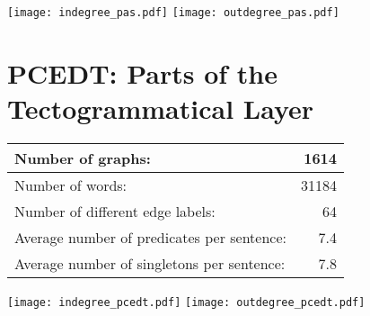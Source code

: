 \documentclass[11pt,a4paper]{article}
\begin{document}
\begin{center}
\texttt{[image: indegree\_pas.pdf]}
\texttt{[image: outdegree\_pas.pdf]}
\end{center}

\section{PCEDT: Parts of the Tectogrammatical Layer}

\begin{tabular}{lr}
\hline\hline
Number of graphs: & 1614\\ 
\hline
Number of words: &  31184\\ 
\hline
Number of different edge labels: & 64\\ 
\hline 
Average number of predicates per sentence:  & 7.4\\ 
\hline 
Average number of singletons per sentence: & 7.8\\
\hline\hline
\end{tabular}
\vspace{10pt}

\begin{center}
\texttt{[image: indegree\_pcedt.pdf]}
\texttt{[image: outdegree\_pcedt.pdf]}
\end{center}

\pagebreak

\end{document}
